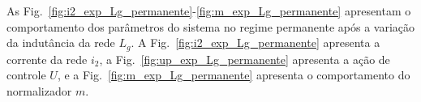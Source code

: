   \newpage

  As Fig.~\ref{fig:i2_exp_Lg_permanente}-\ref{fig:m_exp_Lg_permanente} apresentam o comportamento dos parâmetros do sistema no regime permanente após a variação da indutância da rede $L_g$. A Fig.~\ref{fig:i2_exp_Lg_permanente} apresenta a corrente da rede $i_2$, a Fig.~\ref{fig:up_exp_Lg_permanente} apresenta a ação de controle $U$, e a Fig.~\ref{fig:m_exp_Lg_permanente} apresenta o comportamento do normalizador $m$.

  \vfill
  \noindent
  \begin{minipage}{\textwidth}
    \makebox[\textwidth]{
      \centering
      \def\svgwidth{\textwidth}
      }
    \label{fig:i2_exp_Lg_permanente}
  \end{minipage}
  \vfill

  \newpage

  \vfill
  \noindent
  \begin{minipage}{\textwidth}
    \makebox[\textwidth]{
      \centering
      \def\svgwidth{\textwidth}
      }
    \label{fig:up_exp_Lg_permanente}
  \end{minipage}

  \vfill
  \noindent
  \begin{minipage}{\textwidth}
    \makebox[\textwidth]{
      \centering
      \def\svgwidth{\textwidth}
      }
    \label{fig:m_exp_Lg_permanente}
  \end{minipage}
  \vfill






